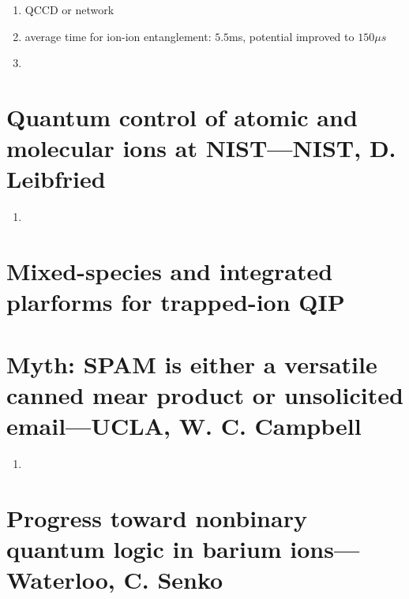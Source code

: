 \begin{enumerate}
    \item QCCD or network
    \item average time for ion-ion entanglement: $5.5$ms, potential improved to $150\mu s$
    \item
\end{enumerate}




\section{Quantum control of atomic and molecular ions at NIST---NIST, D. Leibfried} %
\label{sec:quantum_control_of_atomic_and_molecular_ions_at_nist_nist_d_leibfried}

\begin{enumerate}
    \item
\end{enumerate}
 \section{Mixed-species and integrated plarforms for trapped-ion QIP} %
 \label{sec:mixed_species_and_integrated_plarforms_for_trapped_ion_qip}



\section{Myth: SPAM is either a versatile canned mear product or unsolicited email---UCLA, W. C. Campbell} %
\label{sec:myth_spam_is_either_a_versatile_canned_mear_product_or_unsolicited_email_ucla_w_c_campbell}


\begin{enumerate}
    \item
\end{enumerate}





\section{Progress toward nonbinary quantum logic in barium ions---Waterloo, C. Senko} %
\label{sec:progress_toward_nonbinary_quantum_logic_in_barium_ions_waterloo_c_senko}





